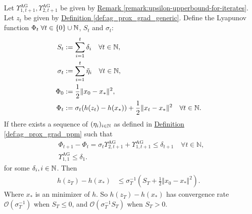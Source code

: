 \documentclass[12pt]{article}
\begin{document}
    \begin{theorem}
    \label{thm:generic_ag_convergence}
        Let $\Upsilon_{1, t + 1}^\text{AG}, \Upsilon_{2, t + 1}^\text{AG}$ be given by 
        \hyperref[remark:upsilon-upperbound-for-iterates]
        {Remark \ref*{remark:upsilon-upperbound-for-iterates}}. 
        Let $z_t$ be given by 
        \hyperref[def:ag_prox_grad_generic]
        {Definition \ref*{def:ag_prox_grad_generic}}. 
        Define the Lyapunov function $\Phi_t\; \forall t \in \{0\}\cup \mathbb N$, $S_t$ and $\sigma_t$: 
        \begin{align*}
            S_t &:= \sum_{i = 1}^{t} \delta_i \quad \forall t \in \mathbb N,
            \\
            \sigma_t &:= \sum_{i = 1}^{t}\tilde \eta_i \quad \forall t \in \mathbb N, 
            \\
            \Phi_0 &:= \frac{1}{2}\Vert x_0 - x_*\Vert^2, 
            \\
            \Phi_t &:= 
                \sigma_t(h(z_t) - h(x_*)) + \frac{1}{2}\Vert x_t - x_*\Vert^2 
            \quad \forall t \in \mathbb N.
        \end{align*}
        If there exists a sequence of $(\eta_i)_{i \in \mathbb N}$ as defined in
        \hyperref[def:ag_prox_grad_ppm]
        {Definition \ref*{def:ag_prox_grad_ppm}} 
        such that
        \begin{align*}
            & \Phi_{t + 1} - \Phi_{t} =
            \sigma_t\Upsilon_{2, t + 1}^{\text{AG}} 
            + 
            \Upsilon_{1, t + 1}^{\text{AG}} 
            \le \delta_{t + 1} \quad 
            \forall t \in \mathbb N, 
            \\
            & \Upsilon_{1, 1}^{\text{AG}} \le \delta_1. 
        \end{align*}
        for some $\delta_i, i \in \mathbb N$. 
        Then
        \begin{align*}
            h(z_T) - h(x_*) &\le 
            \sigma_T^{-1}\left(
                S_{T} + \frac{1}{2}\Vert x_0 - x_*\Vert^2
            \right). 
        \end{align*}
        Where $x_*$ is an minimizer of $h$. 
        So $h(z_T) - h(x_*)$ has convergence rate $\mathcal O(\sigma_T^{-1})$ when $S_T \le 0$, and $\mathcal O(\sigma_T^{-1}S_T)$ when $S_T > 0$. 
    \end{theorem}
\end{document}
